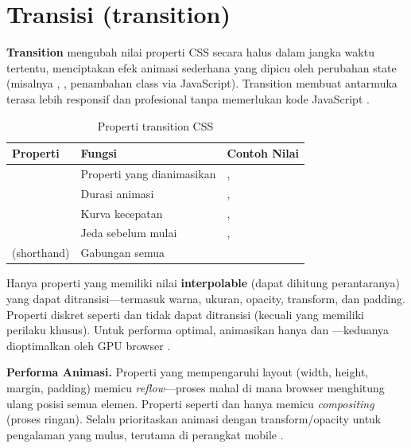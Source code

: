 ﻿\section{Transisi (transition)}

\textbf{Transition} mengubah nilai properti CSS secara halus dalam jangka waktu tertentu, menciptakan efek animasi sederhana yang dipicu oleh perubahan state (misalnya , , penambahan class via JavaScript). Transition membuat antarmuka terasa lebih responsif dan profesional tanpa memerlukan kode JavaScript \cite{mdnCss}.

\begin{table}[H]
\centering
\footnotesize
\setlength{\tabcolsep}{3pt}
\begin{tabular}{|P{5.8cm}|P{3.25cm}|P{3.25cm}|}
\hline
\textbf{Properti} & \textbf{Fungsi} & \textbf{Contoh Nilai} \\
\hline
{} & Properti yang dianimasikan & ,  \\
\hline
{} & Durasi animasi & ,  \\
\hline
{} & Kurva kecepatan & ,  \\
\hline
{} & Jeda sebelum mulai & ,  \\
\hline
{} (shorthand) & Gabungan semua &  \\
\hline
\end{tabular}
\caption{Properti transition CSS}
\end{table}

Hanya properti yang memiliki nilai \textbf{interpolable} (dapat dihitung perantaranya) yang dapat ditransisi---termasuk warna, ukuran, opacity, transform, dan padding. Properti diskret seperti  dan  tidak dapat ditransisi (kecuali  yang memiliki perilaku khusus). Untuk performa optimal, animasikan hanya  dan ---keduanya dioptimalkan oleh GPU browser \cite{webdevCss}.

\begin{konsep}
\textbf{Performa Animasi.} Properti yang mempengaruhi layout (width, height, margin, padding) memicu \textit{reflow}---proses mahal di mana browser menghitung ulang posisi semua elemen. Properti seperti  dan  hanya memicu \textit{compositing} (proses ringan). Selalu prioritaskan animasi dengan transform/opacity untuk pengalaman yang mulus, terutama di perangkat mobile \cite{cssTricks}.
\end{konsep}

